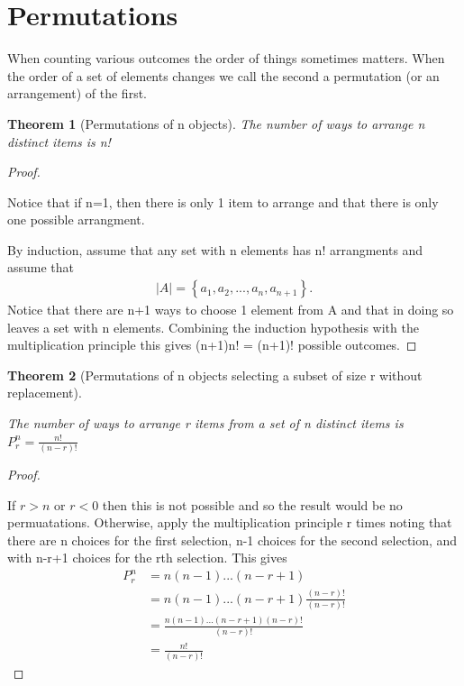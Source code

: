 \documentclass[10pt,]{book}
\theoremstyle{plain}
\newtheorem{theorem}{Theorem}[section]
\theoremstyle{definition}
\theoremstyle{definition}
\theoremstyle{definition}
\numberwithin{equation}{section}
\newcommand{\lt}{ < }
\newcommand{\gt}{ > }
\begin{document}
\section[{Permutations}]{Permutations}\label{section-14}
When counting various outcomes the order of things sometimes matters. When the order of a set of elements changes we call the second a permutation (or an arrangement) of the first.%
\begin{theorem}[{Permutations of n objects}]\label{theorem-10}
The number of ways to arrange n distinct items is n!\end{theorem}
\begin{proof}\hypertarget{proof-7}{}
Notice that if n=1, then there is only 1 item to arrange and 
			that there is only one possible arrangment.%
\par

			By induction, assume that any set with n elements has n! arrangments 
			and assume that 
			\begin{gather*}
|A| = \left \{ a_1, a_2, ... , a_n, a_{n+1} \right \}.
\end{gather*}
			Notice that there are n+1 ways to choose 1 element from A and that in doing so leaves a set with n elements. Combining the induction hypothesis with the multiplication principle this gives (n+1)n! = (n+1)! possible outcomes.
\end{proof}
\begin{theorem}[{Permutations of n objects selecting a subset of size r without replacement}]\label{theorem-11}
 
			The number of ways to arrange r items from a set of n distinct items 
			is \( P_r^n = \frac{n!}{(n-r)!} \)
\end{theorem}
\begin{proof}\hypertarget{proof-8}{}

			If \(r \gt n\) or \(r \lt 0 \) then this is not possible and so the result would be no permuatations. Otherwise, apply the multiplication principle r times noting that there are 
			n choices for the first selection, n-1 choices for the second
			selection, and with n-r+1 choices for the rth selection. This gives
			\begin{align*}
P_r^n & = n(n-1) ... (n-r+1)\\
& = n(n-1) ... (n-r+1)\frac{(n-r)!}{(n-r)!}\\
& = \frac{n(n-1) ... (n-r+1)(n-r)!}{(n-r)!}\\
& = \frac{n!}{(n-r)!}
\end{align*}
\end{proof}
\end{document}
